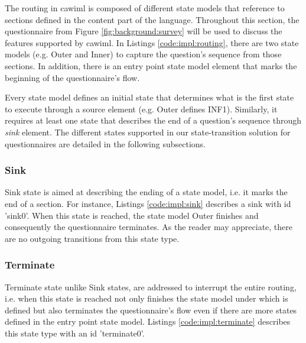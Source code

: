 	The routing in \gls{cawiml} is composed of different state models that reference to sections defined in the content part of the language. Throughout this section, the questionnaire from Figure \ref{fig:background:survey} will be used to discuss the features supported by \gls{cawiml}. In Listings \ref{code:impl:routing}, there are two state models (e.g. Outer and Inner) to capture the question's sequence from those sections. In addition, there is an entry point state model element that marks the beginning of the questionnaire's flow. 

	Every state model defines an initial state that determines what is the first state to execute through a source element (e.g. Outer defines INF1). Similarly, it requires at least one state that describes the end of a question's sequence through \emph{sink} element. The different states supported in our state-transition solution for questionnaires are detailed in the following subsections. %

	

	\subsubsection{Sink}
		Sink state is aimed at describing the ending of a state model, i.e. it marks the end of a section. For instance, Listings \ref{code:impl:sink} describes a sink with id 'sink0'. When this state is reached, the state model Outer finishes and consequently the questionnaire terminates. As the reader may appreciate, there are no outgoing transitions from this state type. 
		

	\subsubsection{Terminate}
		Terminate state unlike Sink states, are addressed to interrupt the entire routing, i.e. when this state is reached not only finishes the state model under which is defined but also terminates the questionnaire's flow even if there are more states defined in the entry point state model. Listings \ref{code:impl:terminate} describes this state type with an id 'terminate0'.
		


